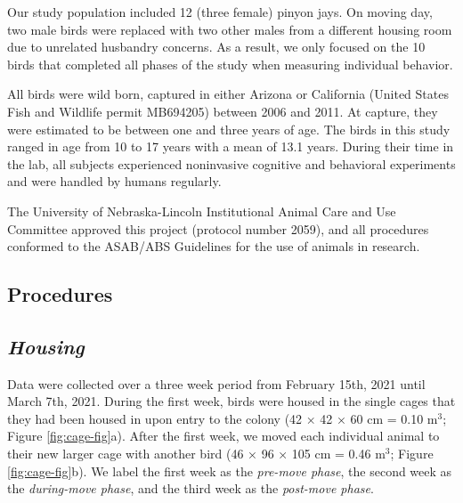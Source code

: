 \documentclass[
  pub]{apa6}
\begin{document}
Our study population included 12 (three female) pinyon jays. On moving day, two male birds were replaced with two other males from a different housing room due to unrelated husbandry concerns. As a result, we only focused on the 10 birds that completed all phases of the study when measuring individual behavior.

All birds were wild born, captured in either Arizona or California (United States Fish and Wildlife permit MB694205) between 2006 and 2011. At capture, they were estimated to be between one and three years of age. The birds in this study ranged in age from 10 to 17 years with a mean of 13.1 years. During their time in the lab, all subjects experienced noninvasive cognitive and behavioral experiments and were handled by humans regularly.

The University of Nebraska-Lincoln Institutional Animal Care and Use Committee approved this project (protocol number 2059), and all procedures conformed to the ASAB/ABS Guidelines for the use of animals in research.

\hypertarget{procedures}{%
\subsection{Procedures}\label{procedures}}

\hypertarget{housing}{%
\subsection{\texorpdfstring{\emph{Housing}}{Housing}}\label{housing}}

Data were collected over a three week period from February 15th, 2021 until March 7th, 2021. During the first week, birds were housed in the single cages that they had been housed in upon entry to the colony (42 × 42 × 60 cm = 0.10 m\(^{3}\); Figure \ref{fig:cage-fig}a). After the first week, we moved each individual animal to their new larger cage with another bird (46 × 96 × 105 cm = 0.46 m\(^{3}\); Figure \ref{fig:cage-fig}b). We label the first week as the \emph{pre-move phase}, the second week as the \emph{during-move phase}, and the third week as the \emph{post-move phase}.
\end{document}
